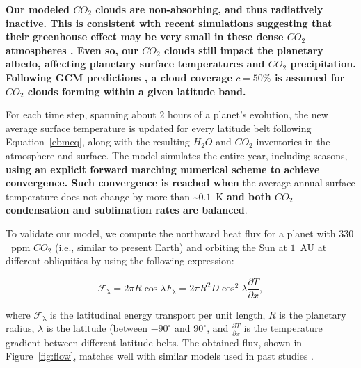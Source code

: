 \documentclass[fleqn,usenatbib]{mnras}
\providecommand{\DIFadd}[1]{{\bf #1}} %
\providecommand{\DIFdel}[1]{} %
\providecommand{\DIFaddbegin}{} %
\providecommand{\DIFaddend}{} %
\providecommand{\DIFdelbegin}{} %
\providecommand{\DIFdelend}{} %
\newcommand{\DIFscaledelfig}{0.5}
\newlength{\DIFdelgraphicswidth} %
\newlength{\DIFdelgraphicsheight} %
\newcommand{\DIFaddincludegraphics}[2][]{{\color{blue}\fbox{\DIFOincludegraphics[#1]{#2}}}} %
\newcommand{\DIFdelincludegraphics}[2][]{%
\sbox{\DIFdelgraphicsbox}{\DIFOincludegraphics[#1]{#2}}%
\settoboxwidth{\DIFdelgraphicswidth}{\DIFdelgraphicsbox} %
\settoboxtotalheight{\DIFdelgraphicsheight}{\DIFdelgraphicsbox} %
\scalebox{\DIFscaledelfig}{%
\parbox[b]{\DIFdelgraphicswidth}{\usebox{\DIFdelgraphicsbox}\\[-\baselineskip] \rule{\DIFdelgraphicswidth}{0em}}\llap{\resizebox{\DIFdelgraphicswidth}{\DIFdelgraphicsheight}{%
\setlength{\unitlength}{\DIFdelgraphicswidth}%
\begin{picture}(1,1)%
\thicklines\linethickness{2pt} %
{\color[rgb]{1,0,0}\put(0,0){\framebox(1,1){}}}%
{\color[rgb]{1,0,0}\put(0,0){\line( 1,1){1}}}%
{\color[rgb]{1,0,0}\put(0,1){\line(1,-1){1}}}%
\end{picture}%
}\hspace*{3pt}}} %
} %
\DeclareRobustCommand{\DIFaddbegin}{\DIFOaddbegin \let\includegraphics\DIFaddincludegraphics} %
\DeclareRobustCommand{\DIFaddend}{\DIFOaddend \let\includegraphics\DIFOincludegraphics} %
\DeclareRobustCommand{\DIFdelbegin}{\DIFOdelbegin \let\includegraphics\DIFdelincludegraphics} %
\DeclareRobustCommand{\DIFdelend}{\DIFOaddend \let\includegraphics\DIFOincludegraphics} %
\begin{document}
\DIFaddbegin \DIFadd{Our modeled $CO_{\mathrm{2}}$ clouds are non-absorbing, and thus radiatively inactive. This is consistent with recent simulations suggesting that their greenhouse effect may be very small in these dense $CO_{\mathrm{2}}$ atmospheres \citep{kitzmann2016}. Even so, our $CO_{\mathrm{2}}$ clouds still impact the planetary albedo, affecting planetary surface temperatures and $CO_{\mathrm{2}}$ precipitation. Following GCM predictions \citep{forget2013}, a cloud coverage $c=50 \%$ is assumed for $CO_{\mathrm{2}}$ clouds forming within a given latitude band. 
}

\DIFaddend For each time step, spanning about $2$ hours of a planet's evolution, the new average surface temperature is updated for every latitude belt following Equation~\ref{ebmeq}, along with the resulting $H_{\mathrm{2}}O$ and $CO_{\mathrm{2}}$ inventories in the atmosphere and surface. The model simulates the entire year, including seasons, \DIFdelbegin \DIFdel{until convergence(i. e., until }\DIFdelend \DIFaddbegin \DIFadd{using an explicit forward marching numerical scheme to achieve convergence. Such convergence is reached when }\DIFaddend the average annual surface temperature does not change by more than \textasciitilde$0.1$~K \DIFdelbegin \DIFdel{) using an explicit forward marching numerical scheme}\DIFdelend \DIFaddbegin \DIFadd{and both $CO_{\mathrm{2}}$ condensation and sublimation rates are balanced}\DIFaddend . 

To validate our model, we compute the northward heat flux for a planet with $330$\DIFaddbegin \DIFadd{~}\DIFaddend ppm $CO_{\mathrm{2}}$ (i.e., similar to present Earth) and orbiting the Sun at $1$~AU at different obliquities by using the following expression:

\begin{equation}
    \mathcal{F}_{\mathrm{\lambda}}=2 \pi R \cos \lambda F_{\mathrm{\lambda}}=2 \pi R^{2} D \cos ^{2} \lambda \frac{\partial T}{\partial x},
\end{equation}

where $\mathcal{F}_{\mathrm{\lambda}}$ is the latitudinal energy transport per unit length, $R$ is the planetary radius, $\lambda$ is the latitude (between $-90^\circ$ and $90^\circ$, and $\frac{\partial T}{\partial x}$ is the temperature gradient between different latitude belts.
The obtained flux, shown in Figure~\ref{fig:flow}, matches well with similar models used in past studies \citep[e.g.,][]{WilliamsPollard}.
\end{document}
